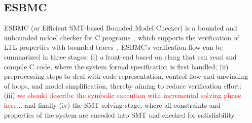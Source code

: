 \documentclass[10pt,conference]{IEEEtran}
\begin{document}
\subsection{ESBMC}
ESBMC (or Efficient SMT-based Bounded Model Checker) is a bounded and unbounded mdoel checker for C programs~\cite{esbmc2018}, which supports the verification of LTL properties with bounded traces~\cite{DBLP:journals/sosym/MorseCN015}. ESBMC's verification flow can be summarized in three stages: (i) a front-end based on clang that can read and compile C code, where the system formal specification is first handled; (ii) preprocessing steps to deal with code representation, control flow and unwinding of loops, and model simplification, thereby aiming to reduce verification effort; (iii) \textcolor{red}{we should describe the symbolic execution with incremental solving phase here...} and finally (iv) the SMT solving stage, where all constraints and properties of the system are encoded into SMT and checked for satisfiability. 
\end{document}
